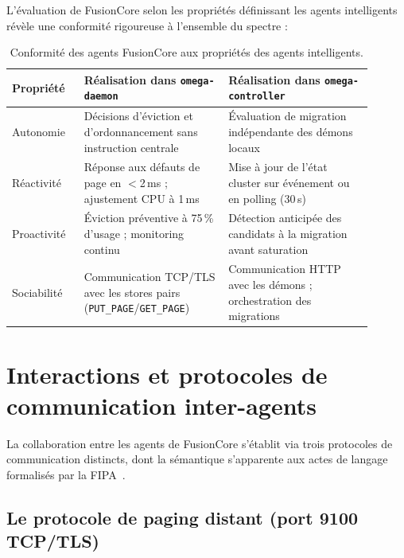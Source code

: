 L'évaluation de FusionCore selon les propriétés définissant les agents intelligents~\cite{wooldridge_2002_sma} révèle une conformité rigoureuse à l'ensemble du spectre :

\begin{table}[htbp]
    \centering
    \caption{Conformité des agents FusionCore aux propriétés des agents intelligents.}
    \label{tab:sma-proprietes}
    \begin{tabular}{p{0.18\linewidth} p{0.36\linewidth} p{0.36\linewidth}}
        \toprule
        \textbf{Propriété} & \textbf{Réalisation dans \texttt{omega-daemon}} & \textbf{Réalisation dans \texttt{omega-controller}} \\
        \midrule
        Autonomie & Décisions d'éviction et d'ordonnancement sans instruction centrale & Évaluation de migration indépendante des démons locaux \\
        Réactivité & Réponse aux défauts de page en $<$2\,ms ; ajustement CPU à 1\,ms & Mise à jour de l'état cluster sur événement ou en polling (30\,s) \\
        Proactivité & Éviction préventive à 75\,\% d'usage ; monitoring continu & Détection anticipée des candidats à la migration avant saturation \\
        Sociabilité & Communication TCP/TLS avec les stores pairs (\texttt{PUT\_PAGE}/\texttt{GET\_PAGE}) & Communication HTTP avec les démons ; orchestration des migrations \\
        \bottomrule
    \end{tabular}
\end{table}

\section{Interactions et protocoles de communication inter-agents}
\label{sec:sma-interactions}

La collaboration entre les agents de FusionCore s'établit via trois protocoles de communication distincts, dont la sémantique s'apparente aux actes de langage formalisés par la FIPA~\cite{fipa_spec_2002}.

\subsection{Le protocole de paging distant (port 9100 TCP/TLS)}

